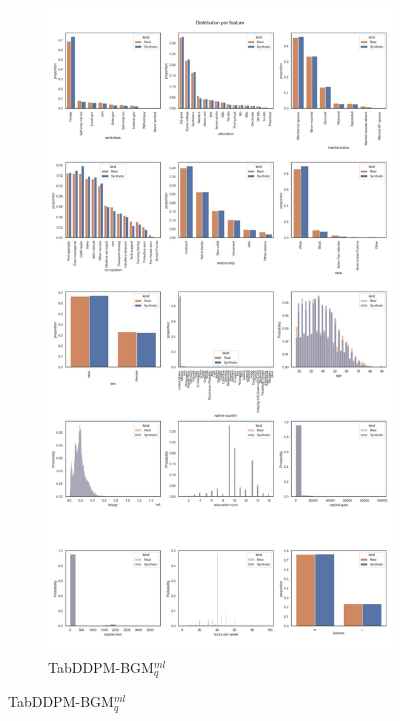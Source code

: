 \newpage
\begin{landscape}
	\begin{figure}[h]
		\centering
		\hfill
		\begin{subfigure}{0.3\linewidth}
			\includegraphics[height=\textheight,width=\linewidth,keepaspectratio]{images/distributions_full/tab-ddpm-bgm.jpg}
			\caption{TabDDPM-BGM$^{ml}_q$}
		\end{subfigure}

\end{figure}
\end{landscape}
